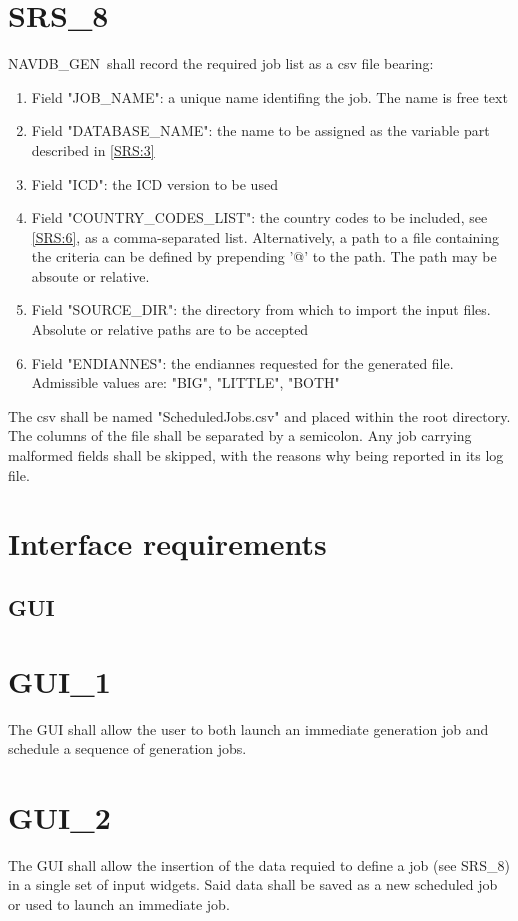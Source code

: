 \documentclass{scrreprt}
\def\NAVDBGEN{NAVDB\_GEN}
\begin{document}
\section{SRS\_8}
\label{SRS:8}
\NAVDBGEN\ shall record the required job list as a csv file bearing:
\begin{enumerate}
  \item Field "JOB\_NAME": a unique name identifing the job. The name is free text
  \item Field "DATABASE\_NAME": the name to be assigned as the variable part described in \ref{SRS:3}
  \item Field "ICD": the ICD version to be used
  \item Field "COUNTRY\_CODES\_LIST": the country codes to be included, see \ref{SRS:6}, as a comma-separated list. Alternatively, a path to a file containing the criteria can be defined by prepending '@' to the path. The path may be absoute or relative.
  \item Field "SOURCE\_DIR": the directory from which to import the input files. Absolute or relative paths are to be accepted
  \item Field "ENDIANNES": the endiannes requested for the generated file. Admissible values are: "BIG", "LITTLE", "BOTH"
\end{enumerate}
The csv shall be named "ScheduledJobs.csv" and placed within the root directory. The columns of the file shall be separated by a semicolon.
Any job carrying malformed fields shall be skipped, with the reasons why being reported in its log file.
\setcounter{secnumdepth}{2}
\section{Interface requirements}
\subsection{GUI}
\setcounter{secnumdepth}{0}
\section{GUI\_1}
The GUI shall allow the user to both launch an immediate generation job and schedule a sequence of generation jobs.
\section{GUI\_2}
The GUI shall allow the insertion of the data requied to define a job (see SRS\_8) in a single set of input widgets. Said data shall be saved as a new scheduled job or used to launch an immediate job.
\end{document}
